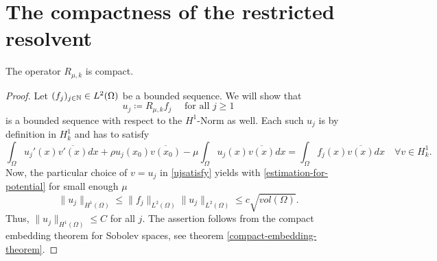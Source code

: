 \section{The compactness of the restricted resolvent} 

\begin{theorem} \label{3.1:thm-Rmuk.isCompact}
	The operator $R_{\mu, k}$ is compact.

	\begin{proof}
	Let $(f_{j})_{j \in \mathbb{N}} \in L^{2}(\Omega)$ be a  bounded sequence. We will show that 
		\[ u_{j} \coloneqq R_{\mu, k} f_{j} \quad \text{ for all } j \geq 1 \]
	is a bounded sequence with respect to the $H^{1}$-Norm as well. Each such $u_{j}$ is by definition in $H^{1}_{k}$ and has to satisfy
		\begin{equation}
			\int_{\Omega} u_{j}'(x) \overline{v'(x)} dx + \rho u_{j}(x_{0}) \overline{v(x_{0})} - \mu \int_{\Omega} u_{j}(x) \overline{v(x)} dx = \int_{\Omega} f_{j}(x) \overline{v(x)} dx \quad \forall v \in H^{1}_{k}. \label{ujsatisfy}
		\end{equation} 
	Now, the particular choice of $v = u_{j}$ in \eqref{ujsatisfy} yields with \eqref{estimation-for-potential} for small enough $\mu$
		\[  \| u_{j} \|_{H^{1}(\Omega)} \leq \| f_{j} \|_{L^{2}(\Omega)} \| u_{j} \|_{L^{2}(\Omega)} \leq c \sqrt{vol(\Omega)}. \]
	Thus, $\| u_{j} \|_{H^{1}(\Omega)} \leq C$ for all $j$. The assertion follows from the compact embedding theorem for Sobolev spaces, see theorem \ref{compact-embedding-theorem}.
	\end{proof}	
\end{theorem}		

